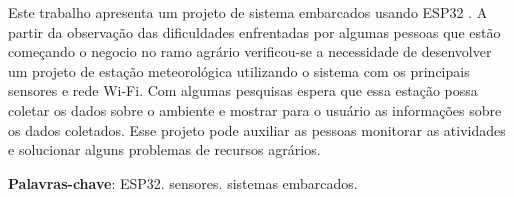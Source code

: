 
Este trabalho apresenta um projeto de sistema embarcados usando ESP32 . A partir da observação das dificuldades enfrentadas por algumas pessoas que estão começando o negocio no ramo agrário verificou-se a necessidade de desenvolver um projeto de estação meteorológica utilizando o sistema com os principais sensores e rede Wi-Fi. Com algumas pesquisas espera que essa estação possa coletar os dados sobre o ambiente e mostrar para o usuário as informações sobre os dados coletados. Esse projeto pode auxiliar as pessoas monitorar as atividades e solucionar alguns problemas de recursos agrários.



\textbf{Palavras-chave}: ESP32. sensores. sistemas embarcados.